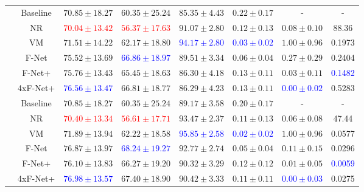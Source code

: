 \begin{table}[h]
{\begin{tabular}{c c c c c c c c}
		\midrule
		\multirow{6}{*}{\rotatebox{90}{$R=8$}} & Baseline & $70.85 \pm 18.27$ & $60.35 \pm 25.24$ & $85.35 \pm 4.43$ & $0.22 \pm 0.17$ & - & -\\  
		 & NR & \textcolor{red}{$70.04 \pm 13.42$} & \textcolor{red}{$56.37 \pm 17.63$} & $91.07 \pm 2.80$ & $0.12 \pm 0.13$ & $0.08 \pm 0.10$ & 88.36 \\
		 & VM & $71.51 \pm 14.22$ & $62.17 \pm 18.80$ & \textcolor{blue}{$94.17 \pm 2.80$} & \textcolor{blue}{$0.03 \pm 0.02$} & $1.00 \pm 0.96$ & 0.1973\\	
		 & F-Net & $75.52 \pm 13.69$ & \textcolor{blue}{$66.86 \pm 18.97$} & $89.51 \pm 3.34$ & $0.06 \pm 0.04$ & $0.27 \pm 0.29$ & 0.2404\\ 
		 & F-Net+ & $75.76 \pm 13.43$ & $65.45 \pm 18.63$ & $86.30 \pm 4.18$ & $0.13 \pm 0.11$ & $0.03 \pm 0.11$ & \textcolor{blue}{0.1482}\\ 
		 & 4xF-Net+ & \textcolor{blue}{$76.56 \pm 13.47$} & $66.81 \pm 18.77$ & $86.29 \pm 4.23$ & $0.13 \pm 0.11$ & \textcolor{blue}{$0.00 \pm 0.02$} & 0.5283\\ 
		 	 
		\midrule		
		\multirow{6}{*}{\rotatebox{90}{$R=10$}} & Baseline & $70.85 \pm 18.27$ & $60.35 \pm 25.24$ & $89.17 \pm 3.58$ & $0.20 \pm 0.17$ & - & -\\ 
		 & NR & \textcolor{red}{$70.40 \pm 13.34$} & \textcolor{red}{$56.61 \pm 17.71$} & $93.47 \pm 2.37$ & $0.11 \pm 0.13$ & $0.06 \pm 0.08$ & 47.44 \\
		 & VM & $71.89 \pm 13.94$ & $62.22 \pm 18.58$ & \textcolor{blue}{$95.85 \pm 2.58$} & \textcolor{blue}{$0.02 \pm 0.02$} & $1.00 \pm 0.96$ & 0.0577\\	 %
		 & F-Net & $76.87 \pm 13.97$ & \textcolor{blue}{$68.24 \pm 19.27$} & $92.77 \pm 2.74$ & $0.05 \pm 0.04$ & $0.11 \pm 0.15$ & 0.0296\\ 
		 & F-Net+ & $76.10 \pm 13.83$ & $66.27 \pm 19.20$ & $90.32 \pm 3.29$ & $0.12 \pm 0.12$ & $0.01 \pm 0.05$ & \textcolor{blue}{0.0059}\\ 
		 & 4xF-Net+ & \textcolor{blue}{$76.98 \pm 13.57$} & $67.40 \pm 18.90$ & $90.42 \pm 3.33$ & $0.11 \pm 0.11$ & \textcolor{blue}{$0.00 \pm 0.03$} & 0.0275\\ 
		 \bottomrule
	\end{tabular}}
\end{table}


